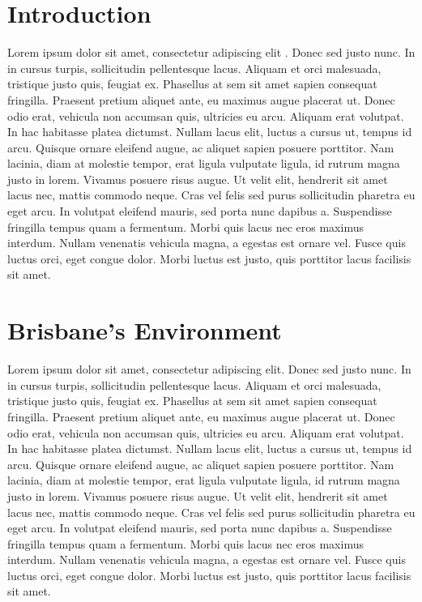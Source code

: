 \documentclass[12pt,openany,oneside]{book}
\let\stdtableofcontents\tableofcontents
\renewcommand{\tableofcontents}{}
\theoremstyle{definition}
\theoremstyle{definition}
\theoremstyle{definition}
\theoremstyle{remark}
\begin{document}
\stdtableofcontents

\mainmatter

\hypertarget{introduction}{%
\chapter{Introduction}\label{introduction}}

Lorem ipsum dolor sit amet, consectetur adipiscing elit
\citep{rexample1}. Donec sed justo nunc. In in cursus turpis,
sollicitudin pellentesque lacus. Aliquam et orci malesuada, tristique
justo quis, feugiat ex. Phasellus at sem sit amet sapien consequat
fringilla. Praesent pretium aliquet ante, eu maximus augue placerat ut.
Donec odio erat, vehicula non accumsan quis, ultricies eu arcu. Aliquam
erat volutpat. In hac habitasse platea dictumst. Nullam lacus elit,
luctus a cursus ut, tempus id arcu. Quisque ornare eleifend augue, ac
aliquet sapien posuere porttitor. Nam lacinia, diam at molestie tempor,
erat ligula vulputate ligula, id rutrum magna justo in lorem. Vivamus
posuere risus augue. Ut velit elit, hendrerit sit amet lacus nec, mattis
commodo neque. Cras vel felis sed purus sollicitudin pharetra eu eget
arcu. In volutpat eleifend mauris, sed porta nunc dapibus a. Suspendisse
fringilla tempus quam a fermentum. Morbi quis lacus nec eros maximus
interdum. Nullam venenatis vehicula magna, a egestas est ornare vel.
Fusce quis luctus orci, eget congue dolor. Morbi luctus est justo, quis
porttitor lacus facilisis sit amet.

\hypertarget{brisbanes-environment}{%
\chapter{Brisbane's Environment}\label{brisbanes-environment}}

Lorem ipsum dolor sit amet, consectetur adipiscing elit. Donec sed justo
nunc. In in cursus turpis, sollicitudin pellentesque lacus. Aliquam et
orci malesuada, tristique justo quis, feugiat ex. Phasellus at sem sit
amet sapien consequat fringilla. Praesent pretium aliquet ante, eu
maximus augue placerat ut. Donec odio erat, vehicula non accumsan quis,
ultricies eu arcu. Aliquam erat volutpat. In hac habitasse platea
dictumst. Nullam lacus elit, luctus a cursus ut, tempus id arcu. Quisque
ornare eleifend augue, ac aliquet sapien posuere porttitor. Nam lacinia,
diam at molestie tempor, erat ligula vulputate ligula, id rutrum magna
justo in lorem. Vivamus posuere risus augue. Ut velit elit, hendrerit
sit amet lacus nec, mattis commodo neque. Cras vel felis sed purus
sollicitudin pharetra eu eget arcu. In volutpat eleifend mauris, sed
porta nunc dapibus a. Suspendisse fringilla tempus quam a fermentum.
Morbi quis lacus nec eros maximus interdum. Nullam venenatis vehicula
magna, a egestas est ornare vel. Fusce quis luctus orci, eget congue
dolor. Morbi luctus est justo, quis porttitor lacus facilisis sit amet.
\end{document}
